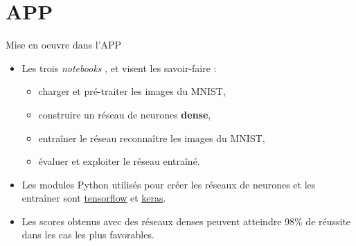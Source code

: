 \documentclass[10pt,serif,mathserif,compress,hyperref={colorlinks}]{beamer}
\begin{document}
\section{APP}

\begin{frame}{Mise en oeuvre dans l'APP}

  \begin{tcolorbox}[title=Étape 1 -- Auto-formation / Réseau dense]
    \begin{itemize}
    \item Les trois {\em notebooks} ,  et  visent les savoir-faire :
      \begin{itemize}
      \item charger et pré-traiter les images du MNIST,
      \item construire un réseau de neurones {\bf dense},
      \item entraîner le réseau reconnaître les images du MNIST,
      \item évaluer et exploiter le réseau entraîné.
      \end{itemize}
      
    \item Les modules Python utilisés pour créer les réseaux de neurones et les entraîner sont \href{https://www.tensorflow.org/tutorials}{tensorflow}
      et \href{https://www.tensorflow.org/versions/r2.4/api_docs/python/tf}{keras}.
    \item Les scores obtenus avec des réseaux denses peuvent atteindre 98\% de réussite dans les cas les plus favorables.
    \end{itemize}
  \end{tcolorbox}

\end{frame}
\end{document}
